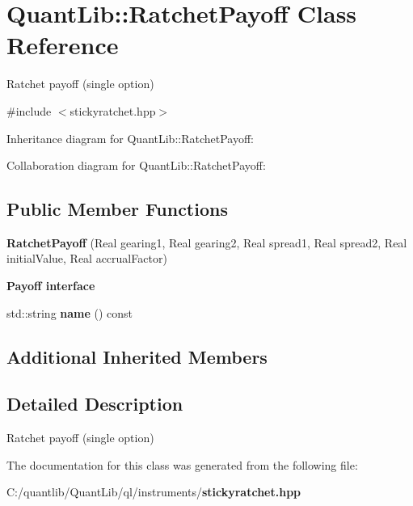 \section{Quant\+Lib\+:\+:Ratchet\+Payoff Class Reference}
\label{class_quant_lib_1_1_ratchet_payoff}


Ratchet payoff (single option)  




{\ttfamily \#include $<$stickyratchet.\+hpp$>$}



Inheritance diagram for Quant\+Lib\+:\+:Ratchet\+Payoff\+:


Collaboration diagram for Quant\+Lib\+:\+:Ratchet\+Payoff\+:
\subsection*{Public Member Functions}
\begin{DoxyCompactItemize}
\item 
{\bfseries Ratchet\+Payoff} (Real gearing1, Real gearing2, Real spread1, Real spread2, Real initial\+Value, Real accrual\+Factor)\label{class_quant_lib_1_1_ratchet_payoff_a2537cc313073ae5c5c9e31c54700d30c}

\end{DoxyCompactItemize}
\begin{Indent}{\bf Payoff interface}\par
\begin{DoxyCompactItemize}
\item 
std\+::string {\bfseries name} () const \label{class_quant_lib_1_1_ratchet_payoff_a136346bcaf1031adfd42d73ec1232a52}

\end{DoxyCompactItemize}
\end{Indent}
\subsection*{Additional Inherited Members}


\subsection{Detailed Description}
Ratchet payoff (single option) 

The documentation for this class was generated from the following file\+:\begin{DoxyCompactItemize}
\item 
C\+:/quantlib/\+Quant\+Lib/ql/instruments/{\bf stickyratchet.\+hpp}\end{DoxyCompactItemize}
